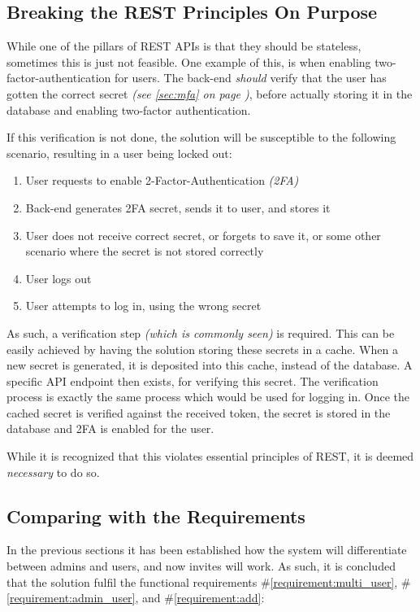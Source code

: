 		\subsection{Breaking the REST Principles On Purpose}
			\label{sec:design:breaking-rest}
			While one of the pillars of REST APIs is that they should be stateless, sometimes this is just not feasible. One example of this, is when enabling two-factor-authentication for users. The back-end \emph{should} verify that the user has gotten the correct secret \emph{(see \ref{sec:mfa} on page \pageref{sec:mfa})}, before actually storing it in the database and enabling two-factor authentication. 

			If this verification is not done, the solution will be susceptible to the following scenario, resulting in a user being locked out:
			\begin{enumerate}
				\item User requests to enable 2-Factor-Authentication \emph{(2FA)}
				\item Back-end generates 2FA secret, sends it to user, and stores it
				\item User does not receive correct secret, or forgets to save it, or some other scenario where the secret is not stored correctly
				\item User logs out
				\item User attempts to log in, using the wrong secret
			\end{enumerate}

			As such, a verification step \emph{(which is commonly seen)} is required. This can be easily achieved by having the solution storing these secrets in a cache. When a new secret is generated, it is deposited into this cache, instead of the database. A specific API endpoint then exists, for verifying this secret. The verification process is exactly the same process which would be used for logging in. Once the cached secret is verified against the received token, the secret is stored in the database and 2FA is enabled for the user.

			While it is recognized that this violates essential principles of REST, it is deemed \emph{necessary} to do so.


		\subsection{Comparing with the Requirements}
			\label{requirement:fulfilled:multi_user}
			\label{requirement:fulfilled:admin_user}
			\label{requirement:fulfilled:add}
			In the previous sections it has been established how the system will differentiate between admins and users, and now invites will work. As such, it is concluded that the solution fulfil the functional requirements \#\ref{requirement:multi_user}, \#\ref{requirement:admin_user}, and \#\ref{requirement:add}:

